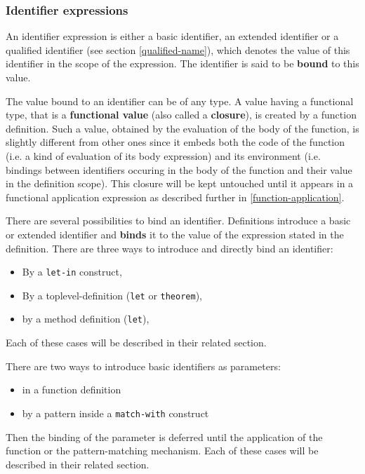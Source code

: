 \subsubsection{Identifier expressions}
\label{identifier-expressions}


An identifier expression is either a basic identifier, an extended
identifier or a qualified identifier (see section
\ref{qualified-name}), which denotes the value of this identifier in
the scope of the expression. The identifier is said to be {\bf bound}
to this value.

The value bound to an identifier can be of any type. A value having a
functional type, that is a {\bf functional
  value}\label{functional-value} (also called a
{\bf closure}), is created by a function definition. Such a value,
obtained by the evaluation of the body of the function, is slightly
different from other ones since it embeds both the code of the
function (i.e. a kind of evaluation of its body expression) and its
environment (i.e. bindings between identifiers occuring in the body of
the function and their value in the definition scope). This closure
will be kept untouched until it appears in a functional application
expression as described further in \ref{function-application}.

There are several possibilities to bind an identifier.  Definitions
introduce a basic or extended identifier and {\bf binds} it to the
value of the expression stated in the definition.  There are three
ways to introduce and directly bind an identifier:
\begin{itemize}
  \item By a {\tt let-in} construct,
  \item By a toplevel-definition ({\tt let} or {\tt theorem}),
  \item by a method definition  ({\tt let}), %
 \end{itemize}
 Each of these cases will
be described in their related section.


There are two ways to introduce basic identifiers as parameters:
\begin{itemize}
\item in a function definition
 \item by a pattern inside a {\tt match-with} construct
\end{itemize}
Then the binding of the parameter is deferred until the application of
the function or the pattern-matching mechanism.
 Each of these cases will
be described in their related section.


